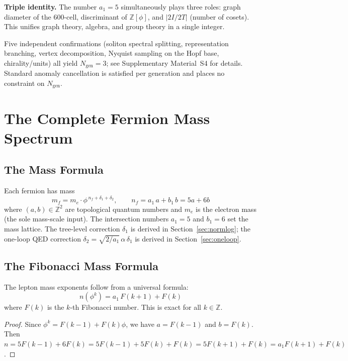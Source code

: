 \documentclass[12pt,a4paper]{article}
\theoremstyle{definition}
\begin{document}
\textbf{Triple identity.} The number $a_1 = 5$ simultaneously plays three roles: graph diameter of the 600-cell, discriminant of $\mathbb{Z}[\phi]$, and $|2I/2T|$ (number of cosets). This unifies graph theory, algebra, and group theory in a single integer.

Five independent confirmations (soliton spectral splitting, representation branching, vertex decomposition, Nyquist sampling on the Hopf base, chirality/units) all yield $N_{\text{gen}} = 3$; see Supplementary Material~S4 for details.  Standard anomaly cancellation is satisfied per generation and places no constraint on $N_{\text{gen}}$.


\section{The Complete Fermion Mass Spectrum}
\label{sec:masses}

\subsection{The Mass Formula}

Each fermion has mass
\begin{equation}
\boxed{m_f = m_e \cdot \phi^{\,n_f + \delta_1 + \delta_2}, \qquad n_f = a_1\,a + b_1\,b = 5a + 6b}
\label{eq:mass_formula}
\end{equation}
where $(a,b) \in \mathbb{Z}^2$ are topological quantum numbers and $m_e$ is the electron mass (the sole mass-scale input). The intersection numbers $a_1 = 5$ and $b_1 = 6$ set the mass lattice.  The tree-level correction $\delta_1$ is derived in Section~\ref{sec:normlog}; the one-loop QED correction $\delta_2 = \sqrt{2/a_1}\,\alpha\,\delta_1$ is derived in Section~\ref{sec:oneloop}.

\subsection{The Fibonacci Mass Formula}

The lepton mass exponents follow from a universal formula:
\begin{equation}
\boxed{n(\phi^k) = a_1\,F(k+1) + F(k)}
\label{eq:fibonacci_mass}
\end{equation}
where $F(k)$ is the $k$-th Fibonacci number. This is exact for all $k \in \mathbb{Z}$.

\begin{proof}
Since $\phi^k = F(k-1) + F(k)\phi$, we have $a = F(k-1)$ and $b = F(k)$. Then $n = 5F(k-1) + 6F(k) = 5F(k-1) + 5F(k) + F(k) = 5F(k+1) + F(k) = a_1 F(k+1) + F(k)$.
\end{proof}
\end{document}
